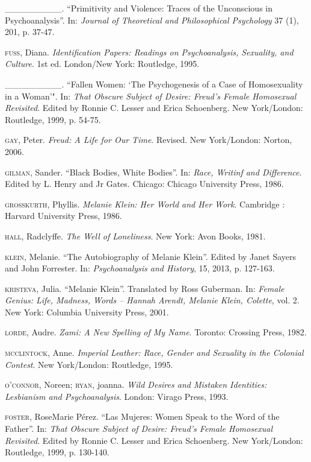\begin{Parskip}
\_\_\_\_\_\_\_\_\_. ``Primitivity and Violence: Traces of the Unconscious
in Psychoanalysis''. In: \emph{Journal of Theoretical and Philosophical
Psychology} 37 (1), 201, p. 37-47.

\textsc{fuss}, Diana. \emph{Identification Papers: Readings on
Psychoanalysis, Sexuality, and Culture}. 1st ed. London/New York: Routledge, 1995.

\_\_\_\_\_\_\_\_\_. ``Fallen Women: `The Psychogenesis of a Case of
Homosexuality in a Woman'". In: \emph{That Obscure Subject of Desire:
Freud's Female Homosexual Revisited}. Edited by Ronnie C. Lesser and
Erica Schoenberg. New York/London: Routledge, 1999, p. 54-75.

\textsc{gay}, Peter. \emph{Freud: A Life for Our Time}. Revised. New York/London: Norton, 2006.

\textsc{gilman}, Sander. ``Black Bodies, White Bodies''. In: \emph{Race,
Writinf and Difference}. Edited by L. Henry and Jr Gates. Chicago:
Chicago University Press, 1986.

\textsc{grosskurth}, Phyllis. \emph{Melanie Klein: Her World and Her Work}.
Cambridge : Harvard University Press, 1986.

\textsc{hall}, Radclyffe. \emph{The Well of Loneliness}. New York: Avon Books, 1981.

\textsc{klein}, Melanie. ``The Autobiography of Melanie Klein''. Edited by
Janet Sayers and John Forrester. In: \emph{Psychoanalysis and History}, 15, 2013, p. 127-163.

\textsc{kristeva}, Julia. ``Melanie Klein''. Translated by Ross
Guberman. In: \emph{Female Genius: Life, Madness, Words -- Hannah Arendt,
Melanie Klein, Colette}, vol. 2. New York: Columbia University Press, 2001.

\textsc{lorde}, Audre. \emph{Zami: A New Spelling of My Name}. Toronto: Crossing Press, 1982.

\textsc{mcclintock}, Anne. \emph{Imperial Leather: Race, Gender and
Sexuality in the Colonial Contest}. New York/London: Routledge, 1995.

\textsc{o'connor}, Noreen; \textsc{ryan}, joanna. \emph{Wild Desires and Mistaken
Identities: Lesbianism and Psychoanalysis}. London: Virago Press, 1993.

\textsc{foster}, RoseMarie Pérez. ``Las Mujeres: Women Speak to the Word of
the Father''. In: \emph{That Obscure Subject of Desire: Freud's Female
Homosexual Revisited}. Edited by Ronnie C. Lesser and Erica Schoenberg. New York/London: Routledge, 1999, p. 130-140.


\end{Parskip}
